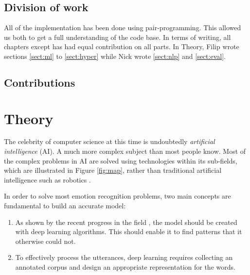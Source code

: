 \documentclass[nofilelist]{cslthse-msc}
\begin{document}
\section{Division of work}

All of the implementation has been done using pair-programming. This allowed us both to get a full understanding of the code base. In terms of writing, all chapters except  has had equal contribution on all parts. 
In Theory, Filip wrote sections \ref{sect:ml} to \ref{sect:hyper} while Nick wrote \ref{sect:nlp} and \ref{sect:eval}. 

\section{Contributions}










\chapter{Theory}
\label{chap:theory}

The celebrity of computer science at this time is undoubtedly \emph{artificial intelligence} (AI). A much more complex subject than most people know. Most of the complex problems in AI are solved using technologies within its sub-fields, which are illustrated in Figure \ref{fig:map}, rather than traditional artificial intelligence such as robotics \citep{bajwa_2020}. 


In order to solve most emotion recognition problems, two main concepts are fundamental to build an accurate model:
\begin{enumerate}
\item As shown by the recent progress in the field \citep{deep_survey}, the model should be created with deep learning algorithms. This should enable it to find patterns that it otherwise could not. 
\item To effectively process the utterances, deep learning requires collecting an annotated corpus and design an appropriate representation for the words.
\end{enumerate}
\end{document}
